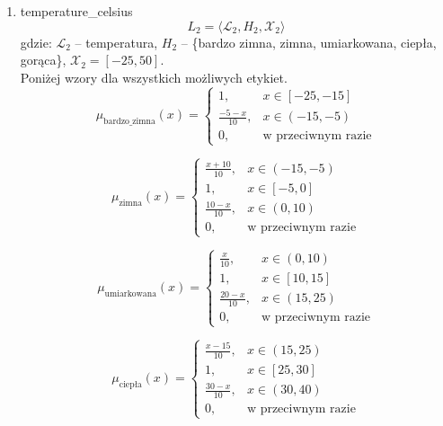 \documentclass{article}
\begin{document}
\begin{enumerate}
    \item temperature\_celsius
        \begin{equation}
            L_2 = \langle \mathcal{L}_2, H_2, \mathcal{X}_2 \rangle
        \end{equation}
        gdzie: $\mathcal{L}_2$ – temperatura, $H_2$ – \{bardzo zimna, zimna, umiarkowana, ciepła, gorąca\}, $\mathcal{X}_2 = [-25, 50]$. \\
        Poniżej wzory dla wszystkich możliwych etykiet.
                \begin{equation}
                   \mu_{\text{bardzo\_zimna}}(x) =
                    \begin{cases}
                    1, & x \in [-25, -15] \\
                    \frac{-5 - x}{10}, & x \in (-15, -5) \\
                    0, & \text{w przeciwnym razie}
                    \end{cases}
                \end{equation}
                
                \begin{equation}
                   \mu_{\text{zimna}}(x) =
                    \begin{cases}
                    \frac{x + 10}{10}, & x \in (-15, -5) \\
                    1, & x \in [-5, 0] \\
                    \frac{10 - x}{10}, & x \in (0, 10) \\
                    0, & \text{w przeciwnym razie}
                    \end{cases}
                \end{equation}

                \begin{equation}
                    \mu_{\text{umiarkowana}}(x) =
                    \begin{cases}
                    \frac{x}{10}, & x \in (0, 10) \\
                    1, & x \in [10, 15] \\
                    \frac{20 - x}{10}, & x \in (15, 25) \\
                    0, & \text{w przeciwnym razie}
                    \end{cases}
                \end{equation}

                \begin{equation}
                    \mu_{\text{ciepła}}(x) =
                    \begin{cases}
                    \frac{x - 15}{10}, & x \in (15, 25) \\
                    1, & x \in [25, 30] \\
                    \frac{30 - x}{10}, & x \in (30, 40) \\
                    0, & \text{w przeciwnym razie}
                    \end{cases}
                \end{equation}


\end{enumerate}
\end{document}
